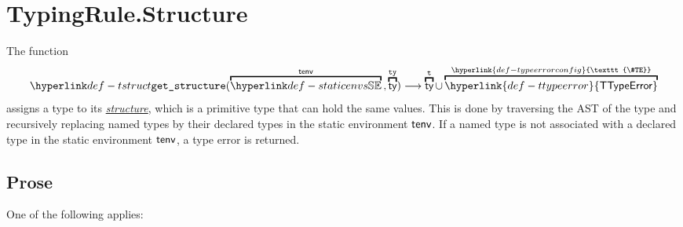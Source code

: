 \documentclass{book}
\newcommand\TTypeError[0]{\hyperlink{def-ttypeerror}{\textsf{TTypeError}}}
\newcommand\TypeErrorConfig[0]{\hyperlink{def-typeerrorconfig}{\texttt{\#TE}}}
\newcommand\structure[0]{\hyperlink{def-structure}{structure}}
\newcommand\vt[0]{\texttt{t}}
\newcommand\tty[0]{\texttt{ty}}
\begin{document}
\section{TypingRule.Structure \label{sec:structure}}
\hypertarget{def-structure}{}
The function
\[
  \tstruct(\overname{\staticenvs}{\tenv} \aslsep \overname{\ty}{\tty}) \aslto \overname{\ty}{\vt} \cup \overname{\TTypeError}{\TypeErrorConfig}
\]
assigns a type to its \hypertarget{def-tstruct}{\emph{\structure}}, which is a primitive type that can hold the same values.
This is done by traversing the AST of the type and recursively replacing named types by their declared types
in the static environment $\textsf{tenv}$.
If a named type is not associated with a declared type in the static environment $\textsf{tenv}$, a type error is returned.

\subsection{Prose}
One of the following applies:
\end{document}
